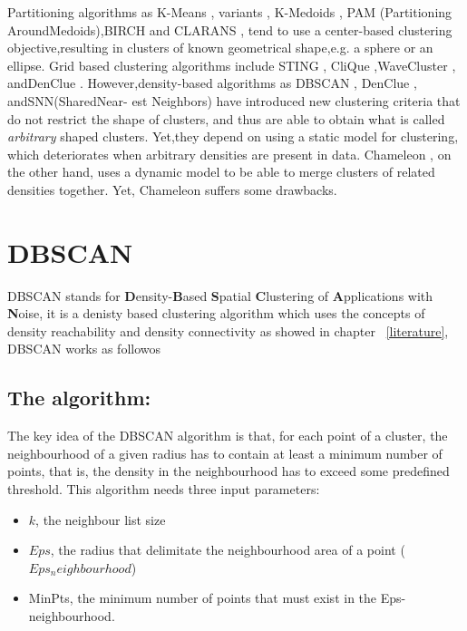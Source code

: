 Partitioning algorithms as K-Means \citep{clustering_1}, variants \citep{clustering_2} \citep{clustering_3}, K-Medoids \citep{clustering_4}, PAM \citep{clustering_5} (Partitioning AroundMedoids),BIRCH \citep{clustering_6} and
CLARANS \citep{clustering_7}, tend to use a center-based clustering objective,resulting in clusters of known geometrical shape,e.g. a sphere or an ellipse. Grid based clustering algorithms include STING \citep{clustering_8}, CliQue \citep{clustering_9},WaveCluster \citep{clustering_10}, andDenClue \citep{clustering_11}.
However,density-based
algorithms as DBSCAN \citep{clustering_12}, DenClue \citep{clustering_11}, andSNN(SharedNear-
est Neighbors) \citep{clustering_13} have introduced new clustering criteria that do not restrict the shape of clusters, and thus are able to obtain what is called \textit{arbitrary} shaped clusters.
Yet,they depend on using a static model for clustering, which deteriorates when arbitrary densities are present in data. Chameleon  \citep{clustering_14}, on the
other hand, uses a dynamic model to be able to merge clusters of related densities together. Yet, Chameleon suffers some drawbacks.

\section{DBSCAN}\label{dbscan}
DBSCAN stands for \textbf{D}ensity-\textbf{B}ased \textbf{S}patial \textbf{C}lustering of \textbf{A}pplications with \textbf{N}oise, it is a denisty based clustering algorithm which uses the concepts of density reachability and density connectivity\citep{literature_1} as showed in chapter ~\ref{literature}, DBSCAN works as followos
\subsection{The algorithm:}
\citep{literature_2}  The key idea of the DBSCAN algorithm is that, for each point of a cluster, the neighbourhood 
of a given radius has to contain at least a minimum number of points, that is, the density in 
the neighbourhood has to exceed some predefined threshold. This algorithm needs three 
input parameters:
\begin{itemize}  
\item{$k$, the neighbour list size} 
\item{$Eps$, the radius that delimitate the neighbourhood area of a point ($Eps_neighbourhood$)}
\item{MinPts, the minimum number of points that must exist in the Eps-neighbourhood.}
\end{itemize} 

